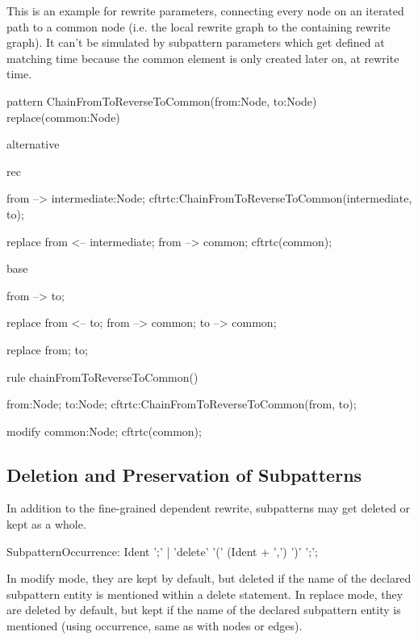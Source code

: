 \begin{example}
This is an example for rewrite parameters, connecting every node on an iterated path to a common node (i.e. the local rewrite graph to the containing rewrite graph).
It can't be simulated by subpattern parameters which get defined at matching time because the common element is only created later on, at rewrite time.

  \begin{grgen}
pattern ChainFromToReverseToCommon(from:Node, to:Node) replace(common:Node)
{
  alternative {
    rec {
      from --> intermediate:Node;
      cftrtc:ChainFromToReverseToCommon(intermediate, to);

      replace {
        from <-- intermediate;
        from --> common;
        cftrtc(common);
      }
    }
    base {
      from --> to;

      replace {
        from <-- to;
        from --> common;
        to --> common;
      }
    }
  }

  replace {
    from; to;
  }
}
  \end{grgen}

  \begin{grgen}  
rule chainFromToReverseToCommon()
{
  from:Node; to:Node;
  cftrtc:ChainFromToReverseToCommon(from, to);

  modify {
    common:Node;
    cftrtc(common);
  }
}
  \end{grgen}
\end{example}

\subsection{Deletion and Preservation of Subpatterns}\label{sub:delpressub}

In addition to the fine-grained dependent rewrite, subpatterns may get deleted or kept as a whole.

\begin{rail}  
  SubpatternOccurrence: 
    Ident ';' |
    'delete' '(' (Ident + ',') ')' ';';
\end{rail}

In modify mode, they are kept by default, but deleted if the name of the declared subpattern entity is mentioned within a delete statement.
In replace mode, they are deleted by default, but kept if the name of the declared subpattern entity is mentioned (using occurrence, same as with nodes or edges).

